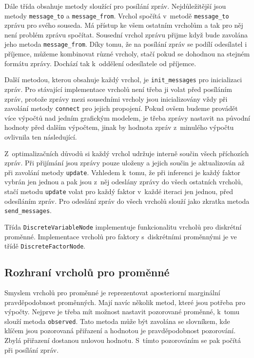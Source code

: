 Dále třída obsahuje metody sloužící pro posílání zpráv.
Nejdůležitější jsou metody \texttt{message\_to} a \texttt{message\_from}.
Vrchol spočítá v~metodě \texttt{message\_to} zprávu pro svého souseda.
Má přístup ke všem ostatním vrcholům a tak pro něj není problém zprávu spočítat.
Sousední vrchol zprávu přijme když bude zavolána jeho metoda \texttt{message\_from}.
Díky tomu, že na posílání zpráv se podílí odesílatel i příjemce, můžeme kombinovat různé vrcholy, stačí pokud se dohodnou na stejném formátu zprávy.
Dochází tak k~oddělení odesílatele od příjemce.

Další metodou, kterou obsahuje každý vrchol, je \texttt{init\_messages} pro inicializaci zpráv. 
Pro stávající implementace vrcholů není třeba ji volat před posíláním zpráv, protože zprávy mezi sousedními vrcholy jsou inicializovány vždy při zavolání metody \texttt{connect} pro jejich propojení.
Pokud ovšem budeme provádět více výpočtů nad jedním grafickým modelem, je třeba zprávy nastavit na původní hodnoty před dalším výpočtem, jinak by hodnota zpráv z~minulého výpočtu ovlivnila ten následující.

Z~optimalizačních důvodů si každý vrchol udržuje interně součin všech příchozích zpráv.
Při přijímání jsou zprávy pouze uloženy a jejich součin je aktualizován až při zavolání metody \texttt{update}.
Vzhledem k~tomu, že při inferenci je každý faktor vybrán jen jednou a pak jsou z~něj odeslány zprávy do všech ostatních vrcholů, stačí metodu \texttt{update} volat pro každý faktor v~každé iteraci jen jednou, před odesíláním zpráv.
Pro odeslání zpráv do všech vrcholů slouží jako zkratka metoda \texttt{send\_messages}.

Třída \texttt{DiscreteVariableNode} implementuje funkcionalitu vrcholů pro diskrétní proměnné.
Implementace vrcholů pro faktory s~diskrétními proměnnými je ve třídě \texttt{DiscreteFactorNode}. 

\subsection{Rozhraní vrcholů pro proměnné}

Smyslem vrcholů pro proměnné je reprezentovat aposteriorní marginální pravděpodobnost proměnných.
Mají navíc několik metod, které jsou potřeba pro výpočty.
Nejprve je třeba mít možnost nastavit pozorované proměnné, k~tomu slouží metoda \texttt{observed}.
Tato metoda může být zavolána se slovníkem, kde klíčem jsou pozorovaná přiřazení a hodnotou je pravděpodobnost pozorování.
Zbylá přiřazení dostanou nulovou hodnotu.
S~tímto pozorováním se pak počítá při posílání zpráv.

